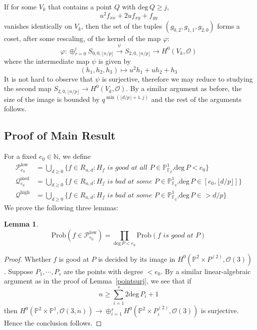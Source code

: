 \documentclass[12pt]{article}
\theoremstyle{plain}
\newtheorem{lemma}[equation]{Lemma}
\theoremstyle{definition}
\newcommand{\sP}{\mathcal{P}}
\newcommand{\IN}{\mathbb{N}}
\newcommand{\IF}{\mathbb{F}}
\newcommand{\IP}{\mathbb{P}}
\newcommand{\sO}{\mathcal{O}}
\renewcommand{\deg}{\mathrm{deg}\,}
\newcommand\union{\bigcup}
\newcommand{\<}{\langle}
\renewcommand{\>}{\rangle}
\newcommand{\fl}[1]{\lfloor #1 \rfloor}
\newcommand{\sQ}{\mathcal{Q}}
\newcommand{\Prob}{\mathrm{Prob}}
\begin{document}
If for some $V_k$ that contains a point $Q$ with $\deg Q \ge j$, 
$$ u^2 f_{xx} + 2u f_{xy} + f_{yy} $$
vanishes identically on $V_k$, then the set of the tuples $(g_{0, 2}, g_{1, 1}, g_{2, 0})$ forms a coset, after some rescaling, of the kernel of the map $\varphi$:
$$ \varphi : \oplus_{r=0}^i S_{0, 0, \fl{n/p}} \stackrel{\psi}{\to} S_{2, 0, \fl{n/p}} \to H^0(V_k, \sO) $$
where the intermediate map $\psi$ is given by 
$$ (h_1, h_2, h_3) \mapsto u^2 h_1 + u h_2 + h_3 $$
It is not hard to observe that $\psi$ is surjective, therefore we may reduce to studying the second map $S_{2, 0, \fl{n/p}} \to H^0(V_k, \sO)$. By a similar argument as before, the size of the image is bounded by $q^{\min(\fl{d/p} + 1, j)}$ and the rest of the arguments follows. 
\subsection{Proof of Main Result}
For a fixed $e_0 \in \IN$, we define 
\begin{align*}
\sP_{e_0}^{\mathrm{low}} &= \union_{d \ge 0} \{ f \in R_{n, d} : H_f \textit{ is good at all $P \in \IP^1_{\IF_q}$,}\deg P < e_0\}\\
\sQ_{e_0}^{\mathrm{med}} &= \union_{d \ge 0} \{f \in R_{n, d} : H_f \textit{ is bad at some $P \in \IP^1_{\IF_q}$,}\deg P \in [e_0, \lfloor d/p \rfloor]\}\\
\sQ^{\mathrm{high}} &= \union_{d \ge 0} \{f \in R_{n, d} : H_f \textit{ is bad at some $P \in \IP^1_{\IF_q}$,}\deg P \in > d/p\}
\end{align*}
We prove the following three lemmas: 
\begin{lemma}
$$\Prob(f \in \sP_{e_0}^{\mathrm{low}}) = \prod_{\deg P < e_0} \Prob(f \textit{ is good at }P)$$
\end{lemma}
\begin{proof}
Whether $f$ is good at $P$ is decided by its image in $H^0(\IP^2 \times P^{(2)}, \sO(3))$. Suppose $P_1, \cdots, P_s$ are the points with degree $< e_0$. By a similar linear-algebraic argument as in the proof of Lemma~\ref{pointsurj}, we see that if $$ n \ge \sum_{i = 1}^s 2 \deg P_i + 1 $$
then $H^0(\IP^2 \times \IP^1, \sO(3, n)) \to \oplus_{i=1}^s H^0(\IP^2 \times P_i^{(2)}, \sO(3))$ is surjective. Hence the conclusion follows. 
\end{proof}
\end{document}
